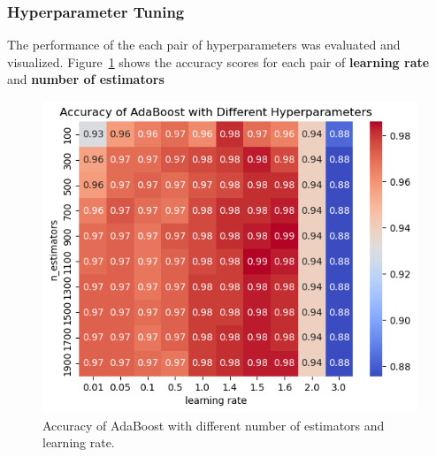 \documentclass[12pt]{article}
\begin{document}
\subsubsection*{Hyperparameter Tuning}
The performance of the each pair of hyperparameters was evaluated and visualized. Figure~\ref{fig:ada_param} shows the accuracy scores for each pair of \textbf{learning rate} and \textbf{number of estimators}
\begin{figure}[H]
    \centering
    \includegraphics[width=0.5\linewidth]{assets/ada/ada-param.png}
    \caption{Accuracy of AdaBoost with different number of estimators and learning rate.}
    \label{fig:ada_param}
\end{figure}
\end{document}
